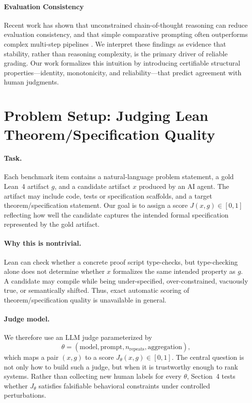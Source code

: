 \documentclass{article}
\begin{document}
\paragraph{Evaluation Consistency}

Recent work has shown that unconstrained chain-of-thought reasoning can reduce evaluation consistency, and that simple comparative prompting often outperforms complex multi-step pipelines \cite{chen2026rethinking}. We interpret these findings as evidence that stability, rather than reasoning complexity, is the primary driver of reliable grading. Our work formalizes this intuition by introducing certifiable structural properties---identity, monotonicity, and reliability---that predict agreement with human judgments.

\section{Problem Setup: Judging Lean Theorem/Specification Quality}

\paragraph{Task.}
Each benchmark item contains a natural-language problem statement, a gold Lean~4 artifact
$g$, and a candidate artifact $x$ produced by an AI agent. The artifact may include code,
tests or specification scaffolds, and a target theorem/specification statement. Our goal is
to assign a score $J(x,g) \in [0,1]$ reflecting how well the candidate captures the intended formal specification represented
by the gold artifact.

\paragraph{Why this is nontrivial.}
Lean can check whether a concrete proof script type-checks, but type-checking alone does
not determine whether $x$ formalizes the same intended property as $g$. A candidate may
compile while being under-specified, over-constrained, vacuously true, or semantically
shifted. Thus, exact automatic scoring of theorem/specification quality is unavailable in
general.

\paragraph{Judge model.}
We therefore use an LLM judge parameterized by
\[
  \theta = (\text{model}, \text{prompt}, n_{\mathrm{repeats}}, \text{aggregation}),
\]
which maps a pair $(x,g)$ to a score $J_\theta(x,g)\in[0,1]$. The central question is not
only how to build such a judge, but when it is trustworthy enough to rank systems. Rather
than collecting new human labels for every $\theta$, Section~4 tests whether $J_\theta$
satisfies falsifiable behavioral constraints under controlled perturbations.
\end{document}
